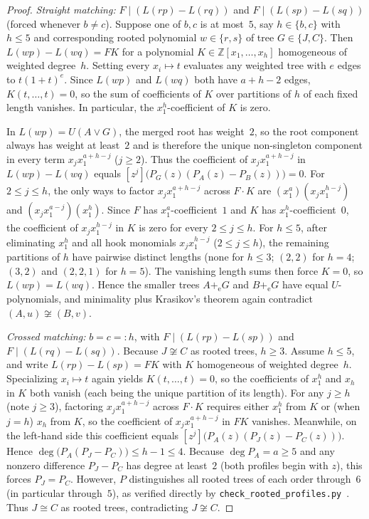 \documentclass[10pt]{article}
\begin{document}
\begin{proof}
\medskip
\noindent\emph{Straight matching:} $F\mid (L(rp)-L(rq))$ and $F\mid (L(sp)-L(sq))$ (forced whenever $b\neq c$). Suppose one of $b,c$ is at most~$5$, say $h\in\{b,c\}$ with $h\le 5$ and corresponding rooted polynomial $w\in\{r,s\}$ of tree $G\in\{J,C\}$. Then $L(wp)-L(wq)=FK$ for a polynomial $K\in\mathbb{Z}[x_1,\ldots,x_h]$ homogeneous of weighted degree~$h$. Setting every $x_i\mapsto t$ evaluates any weighted tree with $e$ edges to $t(1+t)^e$. Since $L(wp)$ and $L(wq)$ both have $a+h-2$ edges, $K(t,\ldots,t)=0$, so the sum of coefficients of $K$ over partitions of $h$ of each fixed length vanishes. In particular, the $x_1^h$-coefficient of $K$ is zero.

In $L(wp)=U(A\vee G)$, the merged root has weight~$2$, so the root component always has weight at least~$2$ and is therefore the unique non-singleton component in every term $x_j x_1^{a+h-j}$ ($j\ge 2$). Thus the coefficient of $x_j x_1^{a+h-j}$ in $L(wp)-L(wq)$ equals $[z^j]\bigl(P_G(z)(P_A(z)-P_B(z))\bigr)=0$. For $2\le j\le h$, the only ways to factor $x_j x_1^{a+h-j}$ across $F\cdot K$ are $(x_1^a)(x_j x_1^{h-j})$ and $(x_j x_1^{a-j})(x_1^h)$. Since $F$ has $x_1^a$-coefficient~$1$ and $K$ has $x_1^h$-coefficient~$0$, the coefficient of $x_j x_1^{h-j}$ in $K$ is zero for every $2\le j\le h$. For $h\le 5$, after eliminating $x_1^h$ and all hook monomials $x_j x_1^{h-j}$ ($2\le j\le h$), the remaining partitions of $h$ have pairwise distinct lengths (none for $h\le 3$; $(2,2)$ for $h=4$; $(3,2)$ and $(2,2,1)$ for $h=5$). The vanishing length sums then force $K=0$, so $L(wp)=L(wq)$. Hence the smaller trees $A+_{\mathrm{e}} G$ and $B+_{\mathrm{e}} G$ have equal $U$-polynomials, and minimality plus Krasikov's theorem again contradict $(A,u)\not\cong (B,v)$.

\medskip
\noindent\emph{Crossed matching:} $b=c=:h$, with $F\mid (L(rp)-L(sp))$ and $F\mid (L(rq)-L(sq))$. Because $J\not\cong C$ as rooted trees, $h\ge 3$. Assume $h\le 5$, and write $L(rp)-L(sp)=FK$ with $K$ homogeneous of weighted degree~$h$. Specializing $x_i\mapsto t$ again yields $K(t,\ldots,t)=0$, so the coefficients of $x_1^h$ and $x_h$ in $K$ both vanish (each being the unique partition of its length). For any $j\ge h$ (note $j\ge 3$), factoring $x_j x_1^{a+h-j}$ across $F\cdot K$ requires either $x_1^h$ from $K$ or (when $j=h$) $x_h$ from $K$, so the coefficient of $x_j x_1^{a+h-j}$ in $FK$ vanishes. Meanwhile, on the left-hand side this coefficient equals $[z^j]\bigl(P_A(z)(P_J(z)-P_C(z))\bigr)$. Hence $\deg\bigl(P_A(P_J-P_C)\bigr)\le h-1\le 4$. Because $\deg P_A = a \ge 5$ and any nonzero difference $P_J-P_C$ has degree at least~$2$ (both profiles begin with $z$), this forces $P_J=P_C$. However, $P$ distinguishes all rooted trees of each order through~$6$ (in particular through~$5$), as verified directly by \texttt{check\_rooted\_profiles.py}~\cite{repo}. Thus $J\cong C$ as rooted trees, contradicting $J\not\cong C$.
\end{proof}
\end{document}
